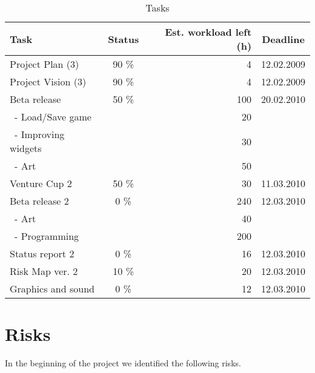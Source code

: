 \documentclass[12pt,a4paper]{article}
\begin{document}
\begin{table}[h!]
\small
\begin{tabular}{ l | c | r | c}
Task				&Status		&Est. workload left (h)	&Deadline \\\hline\hline
Project Plan (3) 	&90	\%		&4					&12.02.2009\\
Project Vision (3)	&90 	\%		&4					&12.02.2009\\
Beta release		&50 \%		&100				&20.02.2010\\
\ - Load/Save game	&			&20					&\\
\ - Improving widgets	&			&30					&\\
\ - Art				&			&50					&\\
Venture Cup 2		&50 \%		&30					&11.03.2010\\
Beta release 2		&0 \%		&240				&12.03.2010\\
\ - Art				&			&40					&\\
\ - Programming	&			&200				&\\
Status report 2		&0 \%		&16					&12.03.2010\\
Risk Map ver. 2		&10 \%		&20					&12.03.2010\\
Graphics and sound	&0 \%		&12					&12.03.2010
\end{tabular}
\caption{Tasks}
\label{tab:tasks}
\end{table}

\section{Risks}

In the beginning of the project we identified the following risks.
\end{document}
